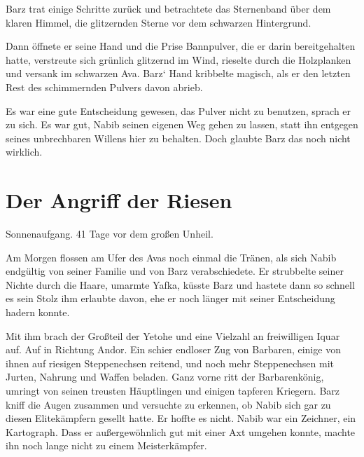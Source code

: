 Barz trat einige Schritte zurück und betrachtete das Sternenband über dem klaren Himmel, die glitzernden Sterne vor dem schwarzen Hintergrund.

Dann öffnete er seine Hand und die Prise Bannpulver, die er darin bereitgehalten hatte, verstreute sich grünlich glitzernd im Wind, rieselte durch die Holzplanken und versank im schwarzen Ava. Barz‘ Hand kribbelte magisch, als er den letzten Rest des schimmernden Pulvers davon abrieb.

Es war eine gute Entscheidung gewesen, das Pulver nicht zu benutzen, sprach er zu sich. Es war gut, Nabib seinen eigenen Weg gehen zu lassen, statt ihn entgegen seines unbrechbaren Willens hier zu behalten. Doch glaubte Barz das noch nicht wirklich.

























\newpage
\section{Der Angriff der Riesen}


Sonnenaufgang. 41 Tage vor dem großen Unheil.\bigskip



Am Morgen flossen am Ufer des Avas noch einmal die Tränen, als sich Nabib endgültig von seiner Familie und von Barz verabschiedete. Er strubbelte seiner Nichte durch die Haare, umarmte Yafka, küsste Barz und hastete dann so schnell es sein Stolz ihm erlaubte davon, ehe er noch länger mit seiner Entscheidung hadern konnte.

Mit ihm brach der Großteil der Yetohe und eine Vielzahl an freiwilligen Iquar auf. Auf in Richtung Andor. Ein schier endloser Zug von Barbaren, einige von ihnen auf riesigen Steppenechsen reitend, und noch mehr Steppenechsen mit Jurten, Nahrung und Waffen beladen. Ganz vorne ritt der Barbarenkönig, umringt von seinen treusten Häuptlingen und einigen tapferen Kriegern. Barz kniff die Augen zusammen und versuchte zu erkennen, ob Nabib sich gar zu diesen Elitekämpfern gesellt hatte. Er hoffte es nicht. Nabib war ein Zeichner, ein Kartograph. Dass er außergewöhnlich gut mit einer Axt umgehen konnte, machte ihn noch lange nicht zu einem Meisterkämpfer.

